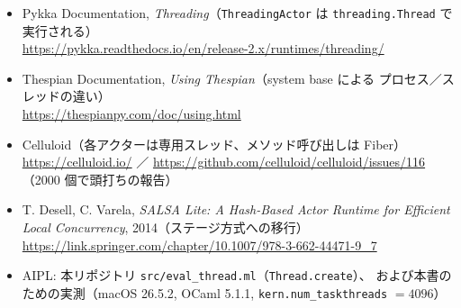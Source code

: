 \documentclass[11pt,a4paper]{ltjsarticle}
\begin{document}
\begin{itemize}
  \url{https://www.ponylang.io/faq/runtime/}
\item Pykka Documentation, \emph{Threading}（\texttt{ThreadingActor} は
  \texttt{threading.Thread} で実行される）\\
  \url{https://pykka.readthedocs.io/en/release-2.x/runtimes/threading/}
\item Thespian Documentation, \emph{Using Thespian}（system base による
  プロセス／スレッドの違い）\\
  \url{https://thespianpy.com/doc/using.html}
\item Celluloid（各アクターは専用スレッド、メソッド呼び出しは Fiber）\\
  \url{https://celluloid.io/} ／
  \url{https://github.com/celluloid/celluloid/issues/116}（2000 個で頭打ちの報告）
\item T. Desell, C. Varela, \emph{SALSA Lite: A Hash-Based Actor Runtime for
  Efficient Local Concurrency}, 2014（ステージ方式への移行）\\
  \url{https://link.springer.com/chapter/10.1007/978-3-662-44471-9_7}
\item AIPL: 本リポジトリ \texttt{src/eval\_thread.ml}（\texttt{Thread.create}）、
  および本書のための実測（macOS 26.5.2, OCaml 5.1.1,
  \texttt{kern.num\_taskthreads} $=4096$）
\end{itemize}
\end{document}
